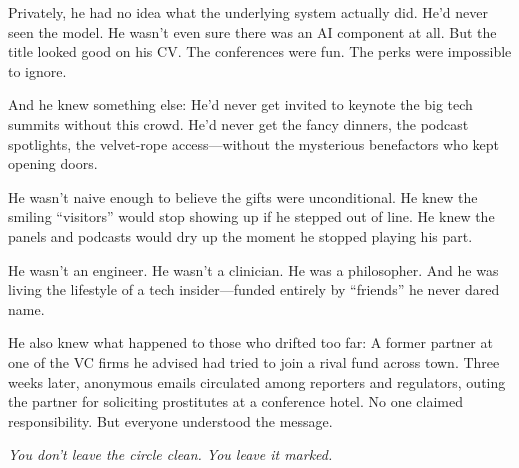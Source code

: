Privately, he had no idea what the underlying system actually did. He’d never seen the model. He wasn’t even sure 
there was an AI component at all. But the title looked good on his CV. The conferences were fun. The perks were 
impossible to ignore.

And he knew something else:  
He’d never get invited to keynote the big tech summits without this crowd.  
He’d never get the fancy dinners, the podcast spotlights, the velvet-rope access—without the mysterious benefactors who kept opening doors.

He wasn’t naive enough to believe the gifts were unconditional.  
He knew the smiling ``visitors'' would stop showing up if he stepped out of line.  
He knew the panels and podcasts would dry up the moment he stopped playing his part.

He wasn’t an engineer. He wasn’t a clinician. He was a philosopher.  
And he was living the lifestyle of a tech insider—funded entirely by ``friends'' he never dared name.

He also knew what happened to those who drifted too far:  
A former partner at one of the VC firms he advised had tried to join a rival fund across town.  
Three weeks later, anonymous emails circulated among reporters and regulators, outing the partner for 
soliciting prostitutes at a conference hotel.  
No one claimed responsibility. But everyone understood the message.  

\textit{You don’t leave the circle clean. You leave it marked.}

\medskip

